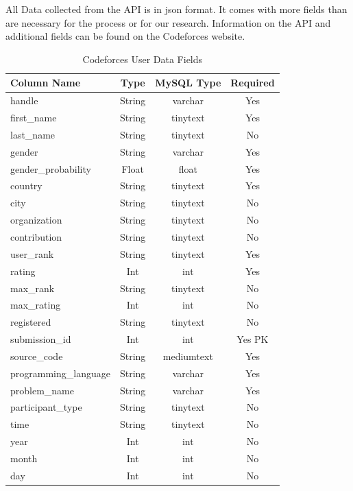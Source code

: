 \documentclass{article}
\begin{document}
All Data collected from the API is in json format. It comes with more fields than are necessary for the process or for our research. Information on the API and additional fields can be found on the Codeforces website.

\begin{table}[t]
    \begin{center}
        \caption{Codeforces User Data Fields}
        \label{tab:cf_data}
        \begin{tabular}{|l | c | c | c |}
            \hline
            \textbf{Column Name} & \textbf{Type} & \textbf{MySQL Type} & \textbf{Required}\\
            \hline
            handle & String & varchar & Yes\\
            first{\_}name & String & tinytext & Yes\\
            last{\_}name & String & tinytext & No\\
            gender & String & varchar & Yes\\
            gender{\_}probability & Float & float & Yes\\
            country & String & tinytext & Yes\\
            city & String & tinytext & No\\
            organization & String & tinytext & No\\
            contribution & String & tinytext & No\\
            user{\_}rank & String & tinytext & Yes\\
            rating & Int & int & Yes\\
            max{\_}rank & String & tinytext & No\\
            max{\_}rating & Int & int & No\\
            registered & String & tinytext & No\\
            \hline
            submission{\_}id & Int & int & Yes PK\\
            source{\_}code & String & mediumtext & Yes\\
            programming{\_}language & String & varchar & Yes\\
            problem{\_}name & String & varchar & Yes\\
            participant{\_}type & String & tinytext & No\\
            time & String & tinytext & No\\
            year & Int & int & No\\
            month & Int & int & No\\
            day & Int & int & No\\
            \hline
        \end{tabular}
    \end{center}
\end{table}
\end{document}

